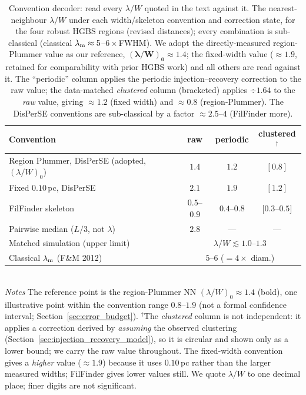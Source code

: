 \documentclass[usenatbib,twoside,twocolumn]{mnras}
\begin{document}
\begin{table}
\caption{Convention decoder: read every $\lambda/W$ quoted in the text against it. The nearest-neighbour $\lambda/W$ under each width/skeleton convention and correction state, for the four robust HGBS regions (revised distances); every combination is sub-classical (classical $\lambda_{\rm m}\approx5$--$6\times$FWHM). We adopt the directly-measured region-Plummer value as our reference, $\boldsymbol{(\lambda/W)_0\approx1.4}$; the fixed-width value ($\approx1.9$, retained for comparability with prior HGBS work) and all others are read against it. The ``periodic'' column applies the periodic injection--recovery correction to the raw value; the data-matched \emph{clustered} column (bracketed) applies $\div1.64$ to the \emph{raw} value, giving $\approx1.2$ (fixed width) and $\approx0.8$ (region-Plummer). The DisPerSE conventions are sub-classical by a factor $\approx2.5$--$4$ (FilFinder more).}
\label{tab:headline}
\footnotesize
\setlength{\tabcolsep}{4pt}
\begin{tabular}{p{3.6cm}ccc}
\toprule
Convention & raw & periodic & clustered$^{\dagger}$ \\
\midrule
Region Plummer, DisPerSE (adopted, $(\lambda/W)_0$) & $\mathbf{1.4}$ & $1.2$ & $[0.8]$ \\
Fixed $0.10$\,pc, DisPerSE & $2.1$ & $1.9$ & $[1.2]$ \\
FilFinder skeleton & $0.5$--$0.9$ & $0.4$--$0.8$ & $[0.3$--$0.5]$ \\
Pairwise median ($L/3$, not $\lambda$) & $2.8$ & --- & --- \\
\midrule
Matched simulation (upper limit) & \multicolumn{3}{c}{$\lambda/W\lesssim1.0$--$1.3$} \\
Classical $\lambda_{\rm m}$ (F\&M 2012) & \multicolumn{3}{c}{$5$--$6$ ($=4\times$ diam.)} \\
\bottomrule
\end{tabular}
\\[2pt]
\footnotesize
\emph{Notes} The reference point is the region-Plummer NN $(\lambda/W)_0\approx1.4$ (bold), one illustrative point within the convention range $0.8$--$1.9$ (not a formal confidence interval; Section~\ref{sec:error_budget}). $^{\dagger}$The \emph{clustered} column is not independent: it applies a correction derived by \emph{assuming} the observed clustering (Section~\ref{sec:injection_recovery_model}), so it is circular and shown only as a lower bound; we carry the raw value throughout. The fixed-width convention gives a \emph{higher} value ($\approx1.9$) because it uses $0.10$\,pc rather than the larger measured widths; FilFinder gives lower values still. We quote $\lambda/W$ to one decimal place; finer digits are not significant.
\end{table}
\end{document}

